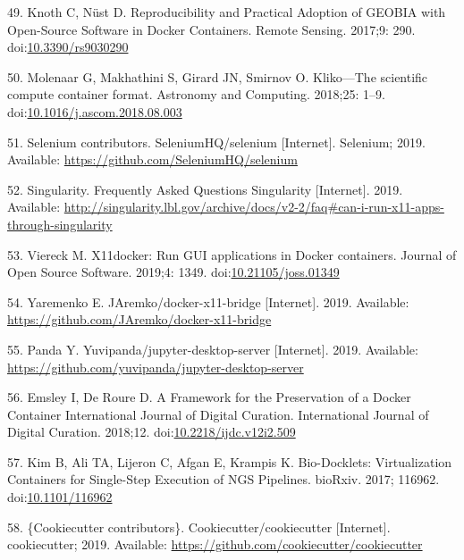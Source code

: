 \documentclass[10pt,letterpaper]{article}
\begin{document}
\leavevmode\hypertarget{ref-knoth_reproducibility_2017}{}%
49. Knoth C, Nüst D. Reproducibility and Practical Adoption of GEOBIA
with Open-Source Software in Docker Containers. Remote Sensing. 2017;9:
290. doi:\href{https://doi.org/10.3390/rs9030290}{10.3390/rs9030290}

\leavevmode\hypertarget{ref-molenaar_klikoscientific_2018}{}%
50. Molenaar G, Makhathini S, Girard JN, Smirnov O. Kliko---The
scientific compute container format. Astronomy and Computing. 2018;25:
1--9.
doi:\href{https://doi.org/10.1016/j.ascom.2018.08.003}{10.1016/j.ascom.2018.08.003}

\leavevmode\hypertarget{ref-selenium_2019}{}%
51. Selenium contributors. SeleniumHQ/selenium {[}Internet{]}. Selenium;
2019. Available: \url{https://github.com/SeleniumHQ/selenium}

\leavevmode\hypertarget{ref-singularity_frequently_2019}{}%
52. Singularity. Frequently Asked Questions Singularity {[}Internet{]}.
2019. Available:
\url{http://singularity.lbl.gov/archive/docs/v2-2/faq\#can-i-run-x11-apps-through-singularity}

\leavevmode\hypertarget{ref-viereck_x11docker_2019}{}%
53. Viereck M. X11docker: Run GUI applications in Docker containers.
Journal of Open Source Software. 2019;4: 1349.
doi:\href{https://doi.org/10.21105/joss.01349}{10.21105/joss.01349}

\leavevmode\hypertarget{ref-yaremenko_docker-x11-bridge_2019}{}%
54. Yaremenko E. JAremko/docker-x11-bridge {[}Internet{]}. 2019.
Available: \url{https://github.com/JAremko/docker-x11-bridge}

\leavevmode\hypertarget{ref-yuvipanda_jupyter-desktop-server_2019}{}%
55. Panda Y. Yuvipanda/jupyter-desktop-server {[}Internet{]}. 2019.
Available: \url{https://github.com/yuvipanda/jupyter-desktop-server}

\leavevmode\hypertarget{ref-emsley_framework_2018}{}%
56. Emsley I, De Roure D. A Framework for the Preservation of a Docker
Container International Journal of Digital Curation. International
Journal of Digital Curation. 2018;12.
doi:\href{https://doi.org/10.2218/ijdc.v12i2.509}{10.2218/ijdc.v12i2.509}

\leavevmode\hypertarget{ref-kim_bio-docklets_2017}{}%
57. Kim B, Ali TA, Lijeron C, Afgan E, Krampis K. Bio-Docklets:
Virtualization Containers for Single-Step Execution of NGS Pipelines.
bioRxiv. 2017; 116962.
doi:\href{https://doi.org/10.1101/116962}{10.1101/116962}

\leavevmode\hypertarget{ref-cookiecutter_contributors_cookiecutter_2019}{}%
58. \{Cookiecutter contributors\}. Cookiecutter/cookiecutter
{[}Internet{]}. cookiecutter; 2019. Available:
\url{https://github.com/cookiecutter/cookiecutter}
\end{document}
